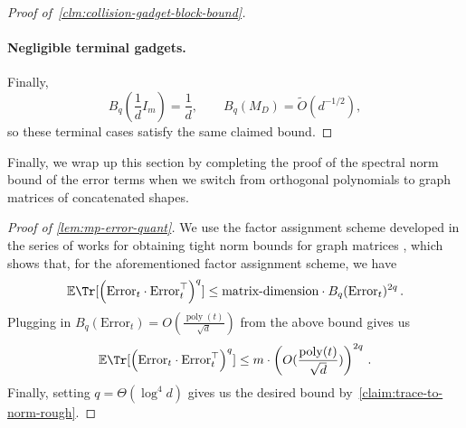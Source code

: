 \documentclass[12pt]{article}
\def \E {\mathbb{E}}
\def \al {\alpha}
\newtheorem{claim}[theorem]{Claim}
\newcommand{\poly}{\operatorname{poly}}
\newcommand{\todo}[1]{\textcolor{red}{(#1)}}
\begin{document}
\begin{proof}[Proof of~\cref{clm:collision-gadget-block-bound}]
\paragraph{Negligible terminal gadgets.}
Finally,
\[
    B_q\!\left(\frac1d I_m\right)=\frac1d,
    \qquad
    B_q(M_D)=\widetilde O(d^{-1/2}),
\]
so these terminal cases satisfy the same claimed bound.

\end{proof}


Finally, we wrap up this section by completing the proof of the spectral norm bound of the error terms when we switch from orthogonal polynomials to graph matrices of concatenated shapes.
\begin{proof}[Proof of \cref{lem:mp-error-quant}]
	We use the factor assignment scheme developed in the series of works for obtaining tight norm bounds for graph matrices \cite{JPRTX, HKPX23, KPX24, Xu25, KX26, PotechinXu2026Theta}, which shows that, for the aforementioned factor assignment scheme, we have \[
	\E\Tr[ \left(\text{Error}_t \cdot \text{Error}_t^\top\right )^q  ] \leq \text{matrix-dimension} \cdot B_q(\text{Error}_t)^{2q}\,.
	 \] 
	 Plugging in $B_q(\text{Error}_t) = O(\frac{\poly(t)}{\sqrt{d}}) $ from the above bound  gives us \[ 
	 \E\Tr[ \left(\text{Error}_t \cdot \text{Error}_t^\top\right )^q  ] \leq  m  \cdot  \left(O(\frac{\poly(t)}{\sqrt{d}}) \right)^{2q}\,.
	  \] 
	  Finally, setting $q= \Theta(\log^4 d)$ gives us the desired bound by~\cref{claim:trace-to-norm-rough}.
	  \end{proof}

%
%
%
%	
\end{document}
